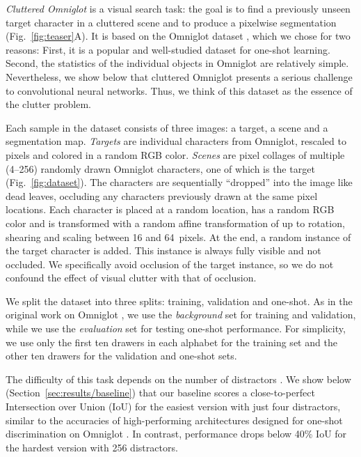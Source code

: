 \documentclass{article}
\begin{document}
{\it Cluttered Omniglot} is a visual search task: the goal is to find a previously unseen target character in a cluttered scene and to produce a pixelwise segmentation (Fig.~\ref{fig:teaser}A).
It is based on the Omniglot dataset \cite{Lake2015}, which we chose for two reasons:
First, it is a popular and well-studied dataset for one-shot learning.
Second, the statistics of the individual objects in Omniglot are relatively simple. Nevertheless, we show below that cluttered Omniglot presents a serious challenge to convolutional neural networks.
Thus, we think of this dataset as the essence of the clutter problem.

Each sample in the dataset consists of three images: a target, a scene and a segmentation map. {\it Targets} are individual characters from Omniglot, rescaled to  pixels and colored in a random RGB color. {\it Scenes} are  pixel collages of multiple (4--256) randomly drawn Omniglot characters, one of which is the target (Fig.~\ref{fig:dataset}). The characters are sequentially ``dropped'' into the image like dead leaves, occluding any characters previously drawn at the same pixel locations. Each character is placed at a random location, has a random RGB color and is transformed with a random affine transformation of up to  rotation,  shearing and scaling between 16 and 64~pixels. At the end, a random instance of the target character is added. This instance is always fully visible and not occluded. We specifically avoid occlusion of the target instance, so we do not confound the effect of visual clutter with that of occlusion.

We split the dataset into three splits: training, validation and one-shot. As in the original work on Omniglot \cite{Lake2015}, we use the {\it background} set for training and validation, while we use the {\it evaluation} set for testing one-shot performance. For simplicity, we use only the first ten drawers in each alphabet for the training set and the other ten drawers for the validation and one-shot sets.

The difficulty of this task depends on the number of distractors \cite{Wolfe1998}. We show below (Section~\ref{sec:results/baseline}) that our baseline scores a close-to-perfect Intersection over Union (IoU) for the easiest version with just four distractors, similar to the accuracies of high-performing architectures designed for one-shot discrimination on Omniglot \cite{Koch2015a, Vinyals2016,Snell2017, Triantafillou2017a, Shyam2017}. In contrast, performance drops below 40\% IoU for the hardest version with 256 distractors.
\end{document}
